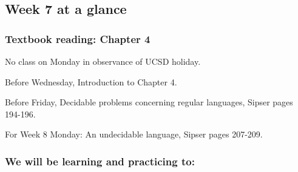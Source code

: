 



\newpage

\subsection*{Week 7 at a glance}

\subsubsection*{Textbook reading: Chapter 4}

\vspace{-20pt}
No class on Monday in observance of UCSD holiday.

Before Wednesday, Introduction to Chapter 4.

Before Friday, Decidable problems concerning regular languages, 
Sipser pages 194-196.

For Week 8 Monday: An undecidable language, Sipser pages 207-209.

\vspace{-20pt}

\subsubsection*{We will be learning and practicing to:}

\vspace{-20pt}

